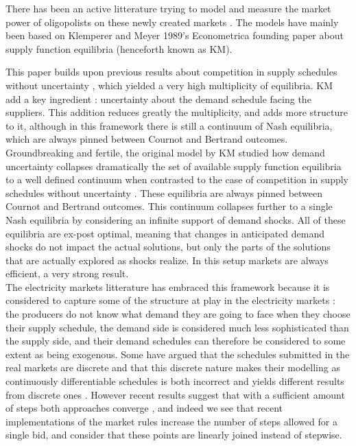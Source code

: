 There has been an active litterature trying to model and measure the market power of oligopolists on these newly created markets \cite{Newgreen, newbery1998competition, green1999electricity}. The models have mainly been based on Klemperer and Meyer 1989's Econometrica founding paper about supply function equilibria \cite{KM} (henceforth known as KM). 

This paper builds upon previous results about competition in supply schedules without uncertainty \cite{grossman1981nash}, which yielded a very high multiplicity of equilibria. KM add a key ingredient : uncertainty about the demand schedule facing the suppliers. This addition reduces greatly the multiplicity, and adds more structure to it, although in this framework there is still a continuum of Nash equilibria, which are always pinned between Cournot and Bertrand outcomes. \\

Groundbreaking and fertile, the original model by KM studied how demand uncertainty collapses dramatically the set of available supply function equilibria to a well defined continuum when contrasted to the case of competition in supply schedules without uncertainty \cite{grossman1981nash}. These equilibria are always pinned between Cournot and Bertrand outcomes. This continuum collapses further to a single Nash equilibria by considering an infinite support of demand shocks. All of these equilibria are ex-post optimal, meaning that changes in anticipated demand shocks do not impact the actual solutions, but only the parts of the solutions that are actually explored as shocks realize. In this setup markets are always efficient, a very strong result. \\

The electricity markets litterature has embraced this framework because it is considered to capture some of the structure at play in the electricity markets : the producers do not know what demand they are going to face when they choose their supply schedule, the demand side is considered much less sophisticated than the supply side, and their demand schedules can therefore be considered to some extent as being exogenous. Some have argued that the schedules submitted in the real markets are discrete and that this discrete nature makes their modelling as continuously differentiable schedules is both incorrect and yields different results from discrete ones \cite{von1993spot}. However recent results suggest that with a sufficient amount of steps both approaches converge \cite{holmberg2008supply}, and indeed we see that recent implementations of the market rules increase the number of steps allowed for a single bid, and consider that these points are linearly joined instead of stepwise.\\


